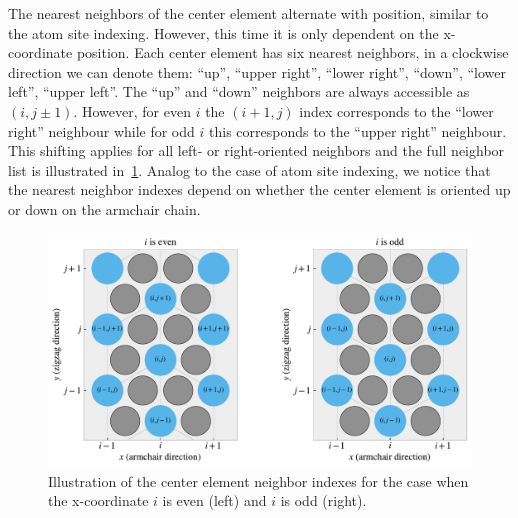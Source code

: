 The nearest neighbors of the center element alternate with position, similar to the atom site indexing. However, this time it is only dependent on the x-coordinate position. Each center element has six nearest neighbors, in a clockwise
direction we can denote them: ``up'', ``upper right'', ``lower right'',
``down'', ``lower left'', ``upper left''. The ``up'' and ``down'' neighbors are always accessible as $(i,j\pm 1)$. However, for even $i$ the $(i+1,j)$ index corresponds to the
``lower right'' neighbour while for odd $i$ this corresponds to the ``upper
right'' neighbour. This shifting applies for all left- or right-oriented neighbors and the full neighbor list is illustrated in~\cref{fig:center_directions}. Analog to the case of atom site indexing, we notice that the nearest neighbor indexes depend on whether the center element is oriented up or down on the armchair chain.

\begin{figure}[!htb]
  \centering
  \includegraphics[width=0.70\linewidth]{figures/system/center_directions.pdf}
  \caption{Illustration of the center element neighbor indexes for the case when the x-coordinate $i$ is even (left) and $i$ is odd (right).}
  \label{fig:center_directions}
\end{figure}

